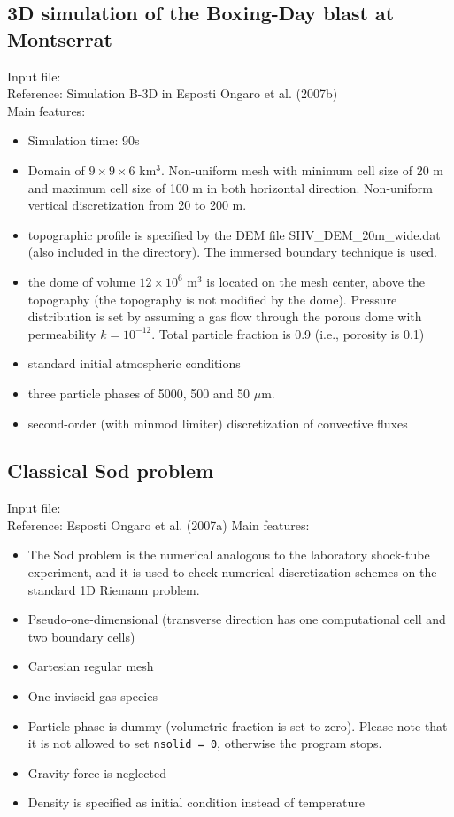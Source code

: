 \subsection{3D simulation of the Boxing-Day blast at Montserrat}
Input file: \\
Reference: Simulation B-3D in Esposti Ongaro et al. (2007b)\\
Main features:
\begin{itemize}
\item Simulation time: 90s
\item Domain of $9\times9\times6$ km$^3$.
      Non-uniform mesh with minimum cell size of 20 m and maximum cell size
      of 100 m in both horizontal direction. Non-uniform vertical 
      discretization from 20 to 200 m.
\item topographic profile is specified by the DEM file SHV\_DEM\_20m\_wide.dat
      (also included in the directory). The immersed boundary technique is used.
\item the dome of volume $12\times 10^6$ m$^3$ is located on the mesh center, 
      above the topography 
      (the topography is not modified by the dome). Pressure distribution
      is set by assuming a gas flow through the porous dome with permeability
      $k=10^{-12}$. Total particle fraction is 0.9 (i.e., porosity is 0.1)
\item standard initial atmospheric conditions 
\item three particle phases of 5000, 500 and 50 $\mu$m.
\item second-order (with minmod limiter) discretization of convective fluxes
\end{itemize}
%
\newpage
\subsection{Classical Sod problem}
Input file: \\
Reference: Esposti Ongaro et al. (2007a)
Main features:
\begin{itemize}
\item The Sod problem is the numerical analogous to the laboratory shock-tube 
experiment, and it is used to check numerical discretization schemes on 
the standard 1D Riemann problem.
\item Pseudo-one-dimensional (transverse direction has one computational cell and two boundary cells)
\item Cartesian regular mesh
\item One inviscid gas species
\item Particle phase is dummy (volumetric fraction is set to zero). Please note that
      it is not allowed to set {\tt nsolid = 0}, otherwise the program stops.
\item Gravity force is neglected
\item Density is specified as initial condition instead of temperature
\end{itemize}

